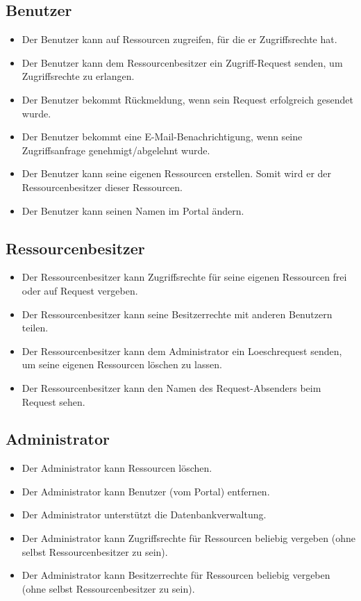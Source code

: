 \documentclass[parskip=full,11pt]{scrartcl}
\begin{document}
\subsection*{Benutzer}
\begin{itemize}[itemsep=0pt]
\item Der Benutzer kann auf Ressourcen zugreifen, für die er \gls{Zugriffsrechte} hat.
\item Der Benutzer kann dem Ressourcenbesitzer ein \gls{Zugriff-Request} senden, um Zugriffsrechte zu erlangen.
\item Der Benutzer bekommt Rückmeldung, wenn sein Request erfolgreich gesendet wurde.
\item Der Benutzer bekommt eine E-Mail-Benachrichtigung, wenn seine Zugriffsanfrage genehmigt/abgelehnt wurde.
\item Der Benutzer kann seine eigenen Ressourcen erstellen. Somit wird er der Ressourcenbesitzer dieser Ressourcen.
\item Der Benutzer kann seinen Namen im Portal ändern.
\end{itemize}
 
\subsection*{Ressourcenbesitzer}
\begin{itemize}[itemsep=0pt]

\item Der Ressourcenbesitzer kann Zugriffsrechte für seine eigenen Ressourcen frei oder auf Request vergeben.
\item Der Ressourcenbesitzer kann seine \gls{Besitzerrechte} mit anderen Benutzern teilen.
\item Der Ressourcenbesitzer kann dem Administrator ein \gls{Loeschrequest} senden, um seine eigenen Ressourcen löschen zu lassen.
\item Der Ressourcenbesitzer kann den Namen des Request-Absenders beim Request sehen.
\end{itemize}
\newpage

\subsection*{Administrator}
\begin{itemize}[itemsep=0pt]
\item Der Administrator kann Ressourcen löschen.
\item Der Administrator kann Benutzer (vom Portal) entfernen.
\item Der Administrator unterstützt die Datenbankverwaltung.
\item Der Administrator kann Zugriffsrechte für Ressourcen beliebig vergeben (ohne selbst Ressourcenbesitzer zu sein).
\item Der Administrator kann Besitzerrechte für Ressourcen beliebig vergeben (ohne selbst Ressourcenbesitzer zu sein). 

\end{itemize}
\end{document}
